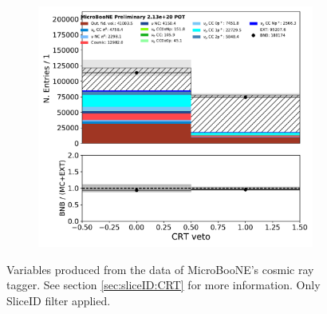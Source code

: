 \begin{figure}[H]
\begin{subfigure}[b]{0.3\textwidth}
        \end{subfigure}
        \begin{subfigure}[b]{0.3\textwidth}
        \centering
        \includegraphics[width=\textwidth]{NuMuCCsel/Images/Ryan/appendix_presel_input_R3/crtveto_07262020_samples_event_category.pdf}
        \end{subfigure}
    \caption{Variables produced from the data of MicroBooNE's cosmic ray tagger. See section \ref{sec:sliceID:CRT} for more information. Only SliceID filter applied.}
    \label{fig::Appendix::constraint:inputvars:crtvars}
\end{figure}

